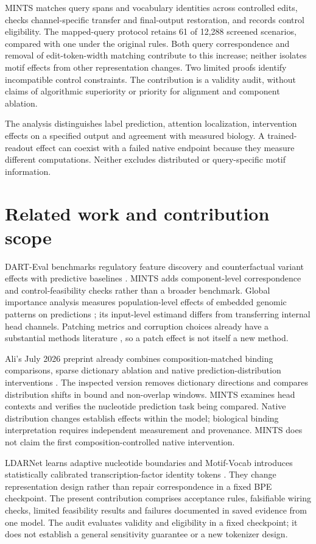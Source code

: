 \documentclass[unnumsec,webpdf,modern,large,namedate]{oup-authoring-template}
\begin{document}
MINTS matches query spans and vocabulary identities across controlled edits, checks channel-specific transfer and final-output restoration, and records control eligibility. The mapped-query protocol retains 61 of 12,288 screened scenarios, compared with one under the original rules. Both query correspondence and removal of edit-token-width matching contribute to this increase; neither isolates motif effects from other representation changes. Two limited proofs identify incompatible control constraints. The contribution is a validity audit, without claims of algorithmic superiority or priority for alignment and component ablation.

The analysis distinguishes label prediction, attention localization, intervention effects on a specified output and agreement with measured biology. A trained-readout effect can coexist with a failed native endpoint because they measure different computations. Neither excludes distributed or query-specific motif information.
\section{Related work and contribution scope}
DART-Eval benchmarks regulatory feature discovery and counterfactual variant effects with predictive baselines \citep{patel2024dart}. MINTS adds component-level correspondence and control-feasibility checks rather than a broader benchmark. Global importance analysis measures population-level effects of embedded genomic patterns on predictions \citep{koo2021gia}; its input-level estimand differs from transferring internal head channels. Patching metrics and corruption choices already have a substantial methods literature \citep{zhang2024metrics,heimersheim2024patching}, so a patch effect is not itself a new method.

Ali's July 2026 preprint already combines composition-matched binding comparisons, sparse dictionary ablation and native prediction-distribution interventions \citep{ali2026causal}. The inspected version removes dictionary directions and compares distribution shifts in bound and non-overlap windows. MINTS examines head contexts and verifies the nucleotide prediction task being compared. Native distribution changes establish effects within the model; biological binding interpretation requires independent measurement and provenance. MINTS does not claim the first composition-controlled native intervention.

LDARNet learns adaptive nucleotide boundaries and Motif-Vocab introduces statistically calibrated transcription-factor identity tokens \citep{ledneva2026ldarnet,li2026motifvocab}. They change representation design rather than repair correspondence in a fixed BPE checkpoint. The present contribution comprises acceptance rules, falsifiable wiring checks, limited feasibility results and failures documented in saved evidence from one model. The audit evaluates validity and eligibility in a fixed checkpoint; it does not establish a general sensitivity guarantee or a new tokenizer design.
\end{document}
